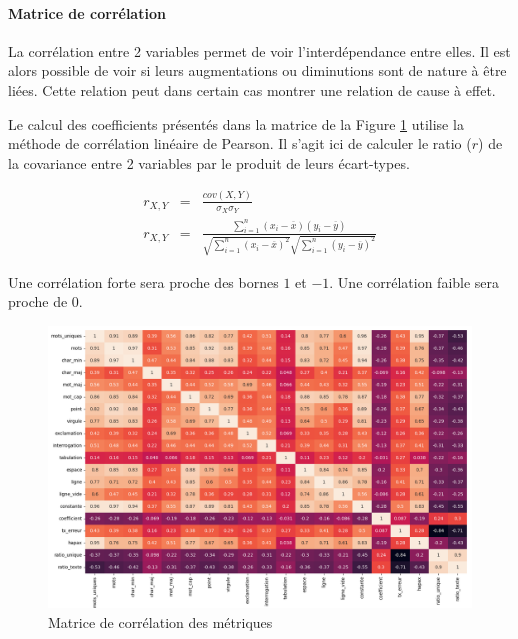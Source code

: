 \documentclass[a4paper,12pt]{article}
\begin{document}
				
			\paragraph{Matrice de corrélation}
				La corrélation entre 2 variables permet de voir l'interdépendance entre elles. Il est alors possible de voir si leurs augmentations ou diminutions sont de nature à être liées. Cette relation peut dans certain cas montrer une relation de cause à effet. 
				
				Le calcul des coefficients présentés dans la matrice de la Figure \ref{fig:corr} utilise la méthode de corrélation linéaire de Pearson.
				Il s'agit ici de calculer le ratio ($r$) de la covariance entre 2 variables par le produit de leurs écart-types.
				
				\begin{eqnarray*}
					r_{X,Y} &=& \frac{cov(X,Y)}{\sigma_{X}\sigma_{Y}}\\
					r_{X,Y} &=& \frac{\sum_{i=1}^{n}(x_{i}-\overline{x})(y_{i}-\overline{y})}{\sqrt{\sum_{i=1}^{n}(x_{i}-\overline{x})^{2}}\sqrt{\sum_{i=1}^{n}(y_{i}-\overline{y})^{2}}}
				\end{eqnarray*}
				
				Une corrélation forte sera proche des bornes $1$ et $-1$. Une corrélation faible sera proche de $0$. 
			
				\begin{figure}[H]
					\includegraphics[width=\linewidth]{img/p2corr.png}
					\caption{Matrice de corrélation des métriques}
					\label{fig:corr}
				\end{figure}	
				
\end{document}
